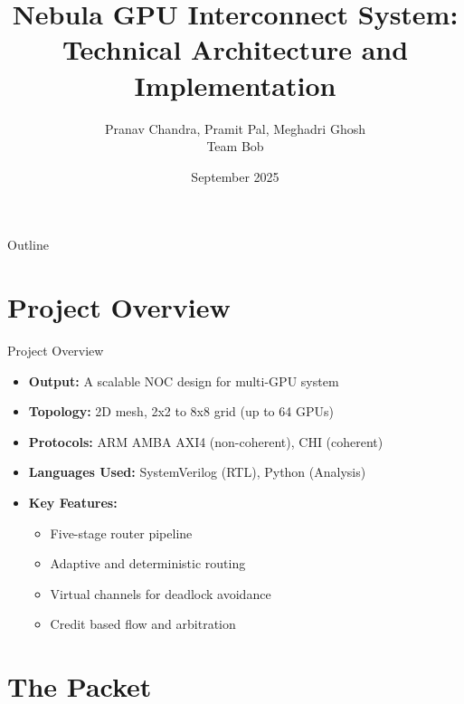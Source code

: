 \documentclass{beamer}
\title[Nebula GPU Interconnect]{Nebula GPU Interconnect System:\\Technical Architecture and Implementation}
\author{Pranav Chandra, Pramit Pal, Meghadri Ghosh\\Team Bob}
\date{September 2025}
\begin{document}
\begin{frame}
  \titlepage
\end{frame}

\begin{frame}{Outline}
  \tableofcontents
\end{frame}

\section{Project Overview}

\begin{frame}{Project Overview}
  \begin{itemize}
	\item \textbf{Output: }A scalable NOC design for multi-GPU system
	\item \textbf{Topology:} 2D mesh, 2x2 to 8x8 grid (up to 64 GPUs)
    \item \textbf{Protocols:} ARM AMBA AXI4 (non-coherent), CHI (coherent)
    \item \textbf{Languages Used:} SystemVerilog (RTL), Python (Analysis)
    \item \textbf{Key Features:}
      \begin{itemize}
        \item Five-stage router pipeline 
        \item Adaptive and deterministic routing
		\item Virtual channels for deadlock avoidance
		\item Credit based flow and arbitration
      \end{itemize}
  \end{itemize}
\end{frame}

\section{The Packet}
\end{document}
